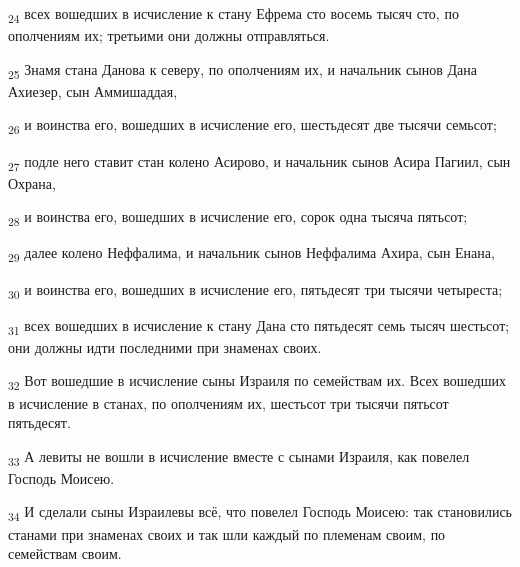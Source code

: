 \begin{tcolorbox}
\textsubscript{24} всех вошедших в исчисление к стану Ефрема сто восемь тысяч сто, по ополчениям их; третьими они должны отправляться.
\end{tcolorbox}
\begin{tcolorbox}
\textsubscript{25} Знамя стана Данова к северу, по ополчениям их, и начальник сынов Дана Ахиезер, сын Аммишаддая,
\end{tcolorbox}
\begin{tcolorbox}
\textsubscript{26} и воинства его, вошедших в исчисление его, шестьдесят две тысячи семьсот;
\end{tcolorbox}
\begin{tcolorbox}
\textsubscript{27} подле него ставит стан колено Асирово, и начальник сынов Асира Пагиил, сын Охрана,
\end{tcolorbox}
\begin{tcolorbox}
\textsubscript{28} и воинства его, вошедших в исчисление его, сорок одна тысяча пятьсот;
\end{tcolorbox}
\begin{tcolorbox}
\textsubscript{29} далее колено Неффалима, и начальник сынов Неффалима Ахира, сын Енана,
\end{tcolorbox}
\begin{tcolorbox}
\textsubscript{30} и воинства его, вошедших в исчисление его, пятьдесят три тысячи четыреста;
\end{tcolorbox}
\begin{tcolorbox}
\textsubscript{31} всех вошедших в исчисление к стану Дана сто пятьдесят семь тысяч шестьсот; они должны идти последними при знаменах своих.
\end{tcolorbox}
\begin{tcolorbox}
\textsubscript{32} Вот вошедшие в исчисление сыны Израиля по семействам их. Всех вошедших в исчисление в станах, по ополчениям их, шестьсот три тысячи пятьсот пятьдесят.
\end{tcolorbox}
\begin{tcolorbox}
\textsubscript{33} А левиты не вошли в исчисление вместе с сынами Израиля, как повелел Господь Моисею.
\end{tcolorbox}
\begin{tcolorbox}
\textsubscript{34} И сделали сыны Израилевы всё, что повелел Господь Моисею: так становились станами при знаменах своих и так шли каждый по племенам своим, по семействам своим.
\end{tcolorbox}
